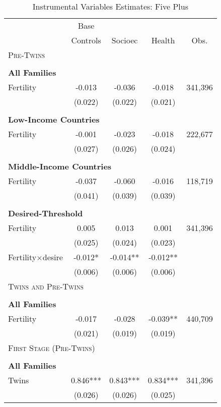 \begin{table}[!htbp] \centering 
\caption{Instrumental Variables Estimates: Five Plus} 
\label{TWINtab:IVFiveplus} 
\begin{tabular}{lcccc} \toprule \toprule 
&Base&&&\\
&Controls&Socioec&Health&Obs.\\\midrule
\multicolumn{5}{l}{\textsc{Pre-Twins}}\\ 
&&&&\\
\multicolumn{5}{l}{\textbf{All Families}}\\ 
Fertility&-0.013&-0.036&-0.018&341,396\\
         &(0.022)&(0.022)&(0.021)&\\
&&&&\\
\multicolumn{5}{l}{\textbf{Low-Income Countries}}\\ 
Fertility&-0.001&-0.023&-0.018&222,677\\
         &(0.027)&(0.026)&(0.024)&\\
&&&&\\
\multicolumn{5}{l}{\textbf{Middle-Income Countries}}\\ 
Fertility&-0.037&-0.060&-0.016&118,719\\
         &(0.041)&(0.039)&(0.039)&\\
&&&&\\
\multicolumn{5}{l}{\textbf{Desired-Threshold}}\\ 
Fertility&0.005&0.013&0.001&341,396\\
         &(0.025)&(0.024)&(0.023)&\\
Fertility$\times$desire&-0.012*&-0.014**&-0.012**&\\
         &(0.006)&(0.006)&(0.006)&\\
\midrule\multicolumn{5}{l}{\textsc{Twins and Pre-Twins}}\\ 
&&&&\\
\multicolumn{5}{l}{\textbf{All Families}}\\ 
Fertility&-0.017&-0.028&-0.039**&440,709\\
         &(0.021)&(0.019)&(0.019)&\\
\midrule\multicolumn{5}{l}{\textsc{First Stage (Pre-Twins)}}\\ 
&&&&\\
\multicolumn{5}{l}{\textbf{All Families}}\\ 
Twins&0.846***&0.843***&0.834***&341,396\\
         &(0.026)&(0.026)&(0.025)&\\

\end{tabular}
\end{table}
